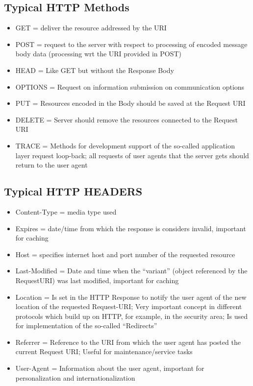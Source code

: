 \documentclass[11pt]{article}
\begin{document}
\subsection{Typical HTTP Methods}
\label{sec:org814a01f}
\begin{itemize}
\item GET = deliver the resource addressed by the URI
\item POST = request to the server with respect to processing of encoded message body data (processing wrt the URI provided in POST)
\item HEAD = Like GET but without the Response Body
\item OPTIONS = Request on information submission on communication options
\item PUT = Resources encoded in the Body should be saved at the Request URI
\item DELETE = Server should remove the resources connected to the Request URI
\item TRACE = Methods for development support of the so-called application layer request loop-back; all requests of user agents that the server gets should return to the user agent
\end{itemize}

\subsection{Typical HTTP HEADERS}
\label{sec:org9dcb18f}
\begin{itemize}
\item Content-Type = media type used
\item Expires = date/time from which the response is considers invalid, important for caching
\item Host = specifies internet host and port number of the requested resource
\item Last-Modified = Date and time when the “variant” (object referenced by the RequestURI) was last modified, important for caching
\item Location = Is set in the HTTP Response to notify the user agent of the new location of the requested Request-URI; Very important concept in different protocols which build up on HTTP, for example, in the security area; Is used for implementation of the so-called “Redirects”
\item Referrer = Reference to the URI from which the user agent has posted the current Request URI; Useful for maintenance/service tasks
\item User-Agent = Information about the user agent, important for personalization and internationalization
\end{itemize}
\end{document}
